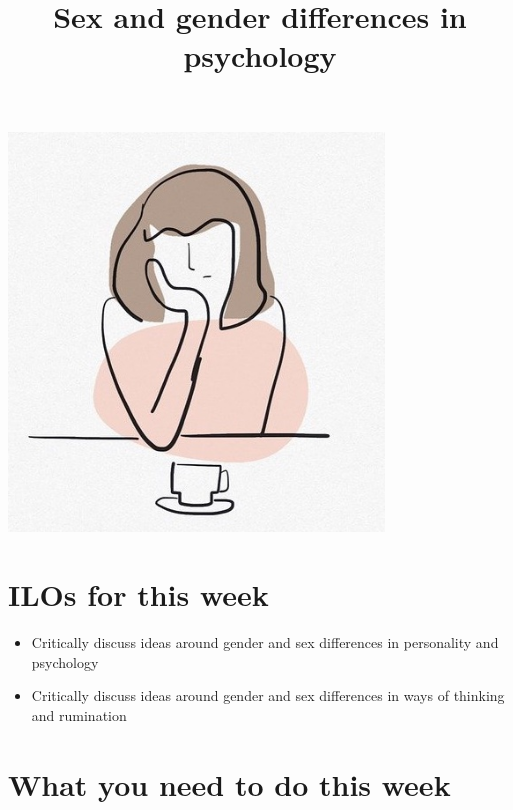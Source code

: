 \documentclass[
]{article}
\title{Sex and gender differences in psychology}
\author{}
\date{\vspace{-2.5em}}
\providecommand{\tightlist}{%
  \setlength{\itemsep}{0pt}\setlength{\parskip}{0pt}}
\begin{document}
\maketitle

{
\setcounter{tocdepth}{2}
\tableofcontents
}
\includegraphics[width=\textwidth,height=4.16667in]{images/ruminate.jpg}

\hypertarget{ilos-for-this-week}{%
\section{ILOs for this week}\label{ilos-for-this-week}}

\begin{itemize}
\tightlist
\item
  Critically discuss ideas around gender and sex differences in
  personality and psychology
\item
  Critically discuss ideas around gender and sex differences in ways of
  thinking and rumination
\end{itemize}

\hypertarget{what-you-need-to-do-this-week}{%
\section{What you need to do this
week}\label{what-you-need-to-do-this-week}}
\end{document}
